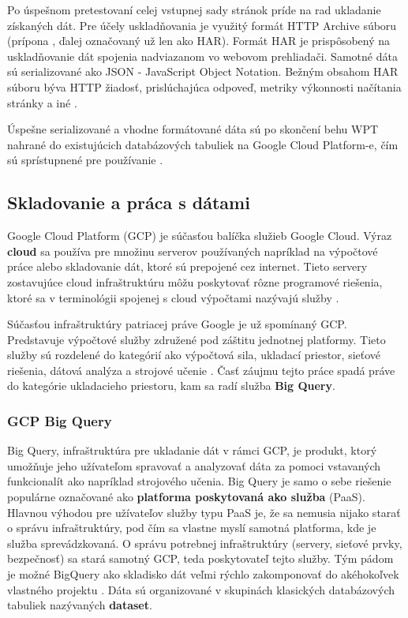 Po úspešnom pretestovaní celej vstupnej sady stránok príde na rad ukladanie získaných dát.
Pre účely uskladňovania je využitý formát HTTP Archive súboru (prípona , ďalej označovaný už len ako HAR).
Formát HAR je prispôsobený na uskladňovanie dát spojenia nadviazanom vo webovom prehliadači. Samotné dáta sú serializované ako JSON - JavaScript Object Notation.
Bežným obsahom HAR súboru býva HTTP žiadosť, prislúchajúca odpoveď, metriky výkonnosti načítania stránky a iné \cite{httparchive-harfile}.

Úspešne serializované a vhodne formátované dáta sú po skončení behu WPT nahrané do existujúcich databázových tabuliek na Google Cloud Platform-e, čím sú sprístupnené pre používanie \cite{httparchive-faq}. 

\subsection{Skladovanie a práca s dátami}
Google Cloud Platform (GCP) je súčasťou balíčka služieb Google Cloud. 
Výraz \textbf{cloud} sa používa pre množinu serverov používaných napríklad na výpočtové práce alebo skladovanie dát, ktoré sú prepojené cez internet.
Tieto servery zostavujúce cloud infraštruktúru môžu poskytovať rôzne programové riešenia, ktoré sa v terminológii spojenej s cloud výpočtami nazývajú služby \cite{cloudflare-clouddefinition}.

Súčasťou infraštruktúry patriacej práve Google je už spomínaný GCP. Predstavuje výpočtové služby združené pod záštitu jednotnej platformy.
Tieto služby sú rozdelené do kategórií ako výpočtová sila, ukladací priestor, sieťové riešenia, dátová analýza a strojové učenie \cite{gfg-gcp}.
Časť záujmu tejto práce spadá práve do kategórie ukladacieho priestoru, kam sa radí služba \textbf{Big Query}.

\subsubsection{GCP Big Query}

Big Query, infraštruktúra pre ukladanie dát v rámci GCP, je produkt, ktorý umožňuje jeho užívateľom spravovať a analyzovať dáta za pomoci vstavaných funkcionalít ako napríklad strojového učenia.
Big Query je samo o sebe riešenie populárne označované ako \textbf{platforma poskytovaná ako služba} (PaaS).
Hlavnou výhodou pre užívateľov služby typu PaaS je, že sa nemusia nijako starať o správu infraštruktúry, pod čím sa vlastne myslí samotná platforma, kde je služba sprevádzkovaná.
O správu potrebnej infraštruktúry (servery, sieťové prvky, bezpečnosť) sa stará samotný GCP, teda poskytovateľ tejto služby.
Tým pádom je možné BigQuery ako skladisko dát veľmi rýchlo zakomponovať do akéhokoľvek vlastného projektu \cite{google-bq}.
Dáta sú organizované v skupinách klasických databázových tabuliek nazývaných \textbf{dataset}.

